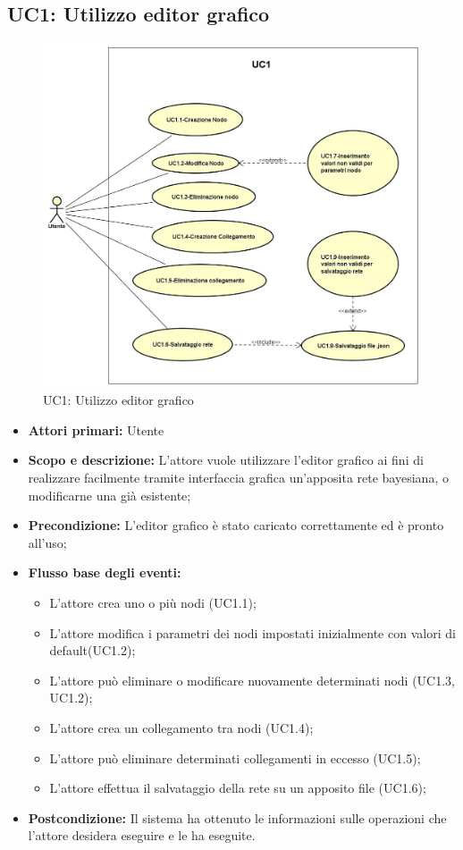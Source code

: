 \subsection{UC1: Utilizzo editor grafico} 
\begin{figure} [H]
	\centering
	\includegraphics[scale=0.45]{Img/UC1} 
	\caption{UC1: Utilizzo editor grafico} \label{} 
\end{figure} 
\begin{itemize} 
	\item{\textbf{Attori primari:} Utente} 
	\item{\textbf{Scopo e descrizione:} L'attore vuole utilizzare l'editor grafico ai fini di realizzare facilmente tramite interfaccia grafica un'apposita rete bayesiana, o modificarne una già esistente;} 
	\item{\textbf{Precondizione:} L'editor grafico è stato caricato correttamente ed è pronto all'uso;} 
	\item{\textbf{Flusso base degli eventi:} 
		\begin{itemize} 
			\item{L'attore crea uno o più nodi (UC1.1);} 
			\item{L'attore modifica i parametri dei nodi impostati inizialmente con valori di default(UC1.2);} 
			\item{L'attore può eliminare o modificare nuovamente determinati nodi (UC1.3, UC1.2)}; 
			\item{L'attore crea un collegamento tra nodi (UC1.4);} 
			\item{L'attore può eliminare determinati collegamenti in eccesso (UC1.5);} 
			\item{L'attore effettua il salvataggio della rete su un apposito file (UC1.6);} 
		\end{itemize} 
	} 
	\item{\textbf{Postcondizione:} Il sistema ha ottenuto le informazioni sulle operazioni che l'attore desidera eseguire e le ha eseguite.} 
\end{itemize} 
